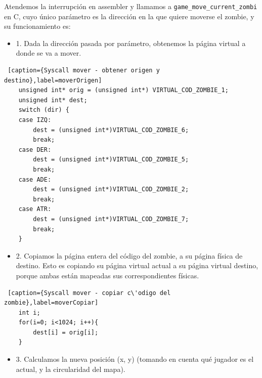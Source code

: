 \par Atendemos la interrupci\'on en assembler y llamamos a \texttt{game_move_current_zombi} en C, cuyo \'unico par\'ametro es la direcci\'on en la que quiere moverse el zombie, y su funcionamiento es:

\begin{itemize}
\item 1. Dada la direcci\'on pasada por par\'ametro, obtenemos la p\'agina virtual a donde se va a mover.
\end{itemize}

\begin{lstlisting} [caption={Syscall mover - obtener origen y destino},label=moverOrigen]
    unsigned int* orig = (unsigned int*) VIRTUAL_COD_ZOMBIE_1;
    unsigned int* dest;
	switch (dir) {
	case IZQ:
    	dest = (unsigned int*)VIRTUAL_COD_ZOMBIE_6;
		break;
    case DER:
    	dest = (unsigned int*)VIRTUAL_COD_ZOMBIE_5; 
    	break;
    case ADE:
    	dest = (unsigned int*)VIRTUAL_COD_ZOMBIE_2;
    	break;
    case ATR:
    	dest = (unsigned int*)VIRTUAL_COD_ZOMBIE_7;    
    	break;
    }
\end{lstlisting}

\begin{itemize}
\item 2. Copiamos la p\'agina entera del c\'odigo del zombie, a su p\'agina f\'isica de destino. Esto es copiando su p\'agina virtual actual a su p\'agina virtual destino, porque ambas est\'an mapeadas sus correspondientes f\'isicas.
\end{itemize}

\begin{lstlisting} [caption={Syscall mover - copiar c\'odigo del zombie},label=moverCopiar]
    int i;
    for(i=0; i<1024; i++){
    	dest[i] = orig[i];
    }
\end{lstlisting}

\begin{itemize}
\item 3. Calculamos la nueva posici\'on (x, y) (tomando en cuenta qu\'e jugador es el actual, y la circularidad del mapa).
\end{itemize}

